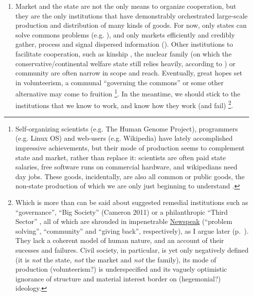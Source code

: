 \documentclass[11pt,a4paper,oneside]{article}
\begin{document}
\begin{enumerate}
	\begin{enumerate}
		\item Market and the state are not the only means to organize cooperation, but they are the only institutions that have demonstrably orchestrated large-scale production and distribution of many kinds of goods.
		For now, only states can solve commons problems (e.g. \citealt{Hardin-1968-aa}), and only markets efficiently and credibly gather, process and signal dispersed information (\citealt{Hayek1931}).
			Other institutions to facilitate cooperation, such as kinship \citep{Van-den-Berghe-1981-aa,Hammond2006}, the nuclear family (on which the conservative/continental welfare state still relies heavily, according to \citealt{Esping-Andersen-1990-aa}) or community \citep{Ostrom1990} are often narrow in scope and reach.
		Eventually, great hopes set in volunteerism, a communal ``governing the commons'' \citep{Ostrom1990} or some other alternative may come to fruition
		\footnote{
			Self-organizing scientists (e.g. The Human Genome Project), programmers (e.g. Linux OS) and web-users (e.g. Wikipedia) have lately accomplished impressive achievements, but their mode of production seems to complement state and market, rather than replace it:
			scientists are often paid state salaries, free software runs on commercial hardware, and wikipedians need day jobs.
			These goods, incidentally, are also all common or public goods, the non-state production of which we are only just beginning to understand \citep{Ostrom1990}.
		}.
		In the meantime, we should stick to the institutions that we know to work, and know how they work (and fail)
			\footnote{
				Which is more than can be said about suggested remedial institutions such as ``governance'', ``Big Society'' (Cameron 2011) or a philanthropic ``Third Sector'' \citep{Anheier2002}, all of which are shrouded in impenetrable \hyperref[sec:newspeak]{Newspeak} (``problem solving'', ``community'' and ``giving back'', respectively), as I argue later (p.~\pageref{sec:newspeak}).
				They lack a coherent model of human nature, and an account of their sucesses and failures. Civil society, in particular, is yet only negatively defined (it is \emph{not} the state, \emph{not} the market and \emph{not} the family), its mode of production (volunteerism?) is underspecified and its vaguely optimistic ignorance of structure and material interest border on (hegemonial?) ideology.
			}.


\end{enumerate}
\end{enumerate}
\end{document}
